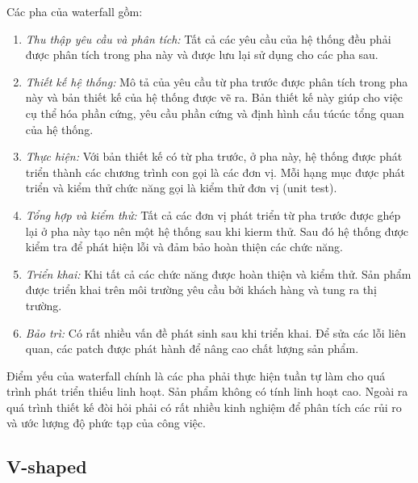 \documentclass{article}
\begin{document}
	Các pha của waterfall gồm:
	\begin{enumerate}
		\item \textit{Thu thập yêu cầu và phân tích:} Tất cả các yêu cầu của hệ thống đều phải được phân tích trong pha này và được lưu lại sử dụng cho các pha sau.
		\item \textit{Thiết kế hệ thống:} Mô tả của yêu cầu từ pha trước được phân tích trong pha này và bản thiết kế của hệ thống được vẽ ra. Bản thiết kế này giúp cho việc cụ thể hóa phần cứng, yêu cầu phần cứng và định hình cấu túcúc tổng quan của hệ thống.
		\item \textit{Thực hiện:} Với bản thiết kế có từ pha trước, ở pha này, hệ thống được phát triển thành các chương trình con gọi là các đơn vị. Mỗi hạng mục được phát triển và kiểm thử chức năng gọi là kiểm thử đơn vị (unit test).
		\item \textit{Tổng hợp và kiểm thử:} Tất cả các đơn vị phát triển từ pha trước được ghép lại ở pha này tạo nên một hệ thống sau khi kierm thử. Sau đó hệ thống được kiểm tra để phát hiện lỗi và đảm bảo hoàn thiện các chức năng.
		
		\item \textit{Triển khai:} Khi tất cả các chức năng được hoàn thiện và kiểm thử. Sản phẩm được triển khai trên môi trường yêu cầu bởi khách hàng và tung ra thị trường.
		\item \textit{Bảo trì:} Có rất nhiều vấn đề phát sinh sau khi triển khai. Để sửa các lỗi liên quan, các patch được phát hành để nâng cao chất lượng sản phẩm.		
		\end{enumerate}
		
	Điểm yếu của waterfall chính là các pha phải thực hiện tuần tự làm cho quá trình phát triển thiếu linh hoạt. Sản phẩm không có tính linh hoạt cao. Ngoài ra quá trình thiết kế đòi hỏi phải có rất nhiều kinh nghiệm để phân tích các rủi ro và ước lượng độ phức tạp của công việc.


\subsection{V-shaped}
\label{V-shaped}
\end{document}
